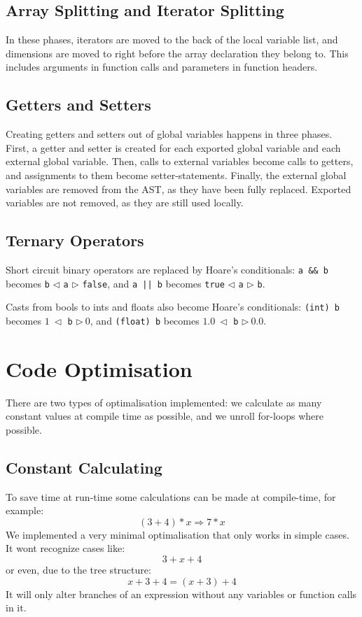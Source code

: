 \documentclass[a4paper,11pt]{report}
\begin{document}
\subsection{Array Splitting and Iterator Splitting}
In these phases, iterators are moved to the back of the local variable list, and dimensions are moved to right before the array declaration they belong to. This includes arguments in function calls and parameters in function headers.

\subsection{Getters and Setters}
Creating getters and setters out of global variables happens in three phases. First, a getter and setter is created for each exported global variable and each external global variable. Then, calls to external variables become calls to getters, and assignments to them become setter-statements. Finally, the external global variables are removed from the AST, as they have been fully replaced. Exported variables are not removed, as they are still used locally.
\subsection{Ternary Operators}
Short circuit binary operators are replaced by Hoare's conditionals: \texttt{a \&\& b} becomes \texttt{b} $\triangleleft$ \texttt{a} $\triangleright$ \texttt{false}, and \texttt{a || b} becomes \texttt{true} $\triangleleft$ \texttt{a} $\triangleright$ \texttt{b}.

Casts from bools to ints and floats also become Hoare's conditionals: \texttt{(int) b} becomes $1~\triangleleft$ \texttt{b} $\triangleright~0$, and \texttt{(float) b} becomes $1.0~\triangleleft$ \texttt{b} $\triangleright~0.0$.

\section{Code Optimisation}
There are two types of optimalisation implemented: we calculate as many constant values at compile time as possible, and we unroll for-loops where possible.
\subsection{Constant Calculating}
To save time at run-time some calculations can be made at compile-time, for example:
\[
(3+4)*x \Rightarrow 7*x
\]
We implemented a very minimal optimalisation that only works in simple cases.
It wont recognize cases like:
\[
3+x+4
\]
or even, due to the tree structure:
\[
x+3+4 = (x+3)+4
\]
It will only alter branches of an expression without any variables or function calls in it.
\end{document}
